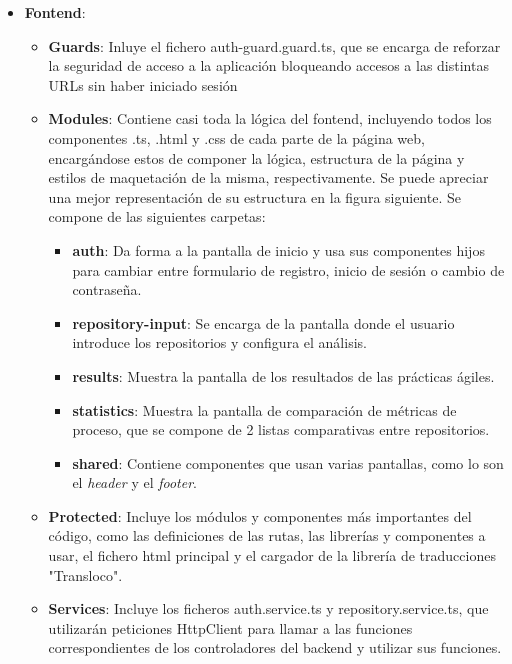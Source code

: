 \begin{itemize}
    \item \textbf{Fontend}:
    \begin{itemize}
    	\item \textbf{Guards}: Inluye el fichero auth-guard.guard.ts, que se encarga de reforzar la seguridad de acceso a la aplicación bloqueando accesos a las distintas URLs sin haber iniciado sesión
    	\item \textbf{Modules}: Contiene casi toda la lógica del fontend, incluyendo todos los componentes .ts, .html y .css de cada parte de la página web, encargándose estos de componer la lógica, estructura de la página y estilos de maquetación de la misma, respectivamente. Se puede apreciar una mejor representación de su estructura en la figura siguiente. Se compone de las siguientes carpetas:
            \begin{itemize}
                \item \textbf{auth}: Da forma a la pantalla de inicio y usa sus componentes hijos para cambiar entre formulario de registro, inicio de sesión o cambio de contraseña.
                \item \textbf{repository-input}: Se encarga de la pantalla donde el usuario introduce los repositorios y configura el análisis.
                \item \textbf{results}: Muestra la pantalla de los resultados de las prácticas ágiles.
                \item \textbf{statistics}: Muestra la pantalla de comparación de métricas de proceso, que se compone de 2 listas comparativas entre repositorios.
                \item \textbf{shared}: Contiene componentes que usan varias pantallas, como lo son el \textit{header} y el \textit{footer}.
            \end{itemize}
    	\item \textbf{Protected}: Incluye los módulos y componentes más importantes del código, como las definiciones de las rutas, las librerías y componentes a usar, el fichero html principal y el cargador de la librería de traducciones "Transloco".
    	\item \textbf{Services}: Incluye los ficheros auth.service.ts y repository.service.ts, que utilizarán peticiones HttpClient para llamar a las funciones correspondientes de los controladores del backend y utilizar sus funciones.
    \end{itemize}


\end{itemize}
